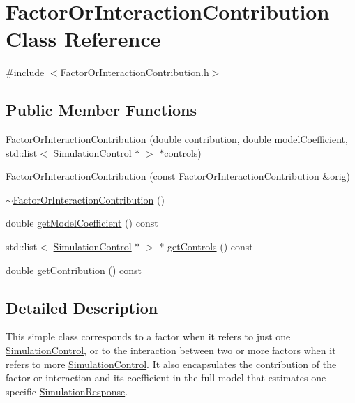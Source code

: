 \hypertarget{class_factor_or_interaction_contribution}{}\section{Factor\+Or\+Interaction\+Contribution Class Reference}
\label{class_factor_or_interaction_contribution}


{\ttfamily \#include $<$Factor\+Or\+Interaction\+Contribution.\+h$>$}

\subsection*{Public Member Functions}
\begin{DoxyCompactItemize}
\item 
\hyperlink{class_factor_or_interaction_contribution_aee33d23a9255292a4c9e7bb7c1b02e2d}{Factor\+Or\+Interaction\+Contribution} (double contribution, double model\+Coefficient, std\+::list$<$ \hyperlink{class_simulation_control}{Simulation\+Control} $\ast$ $>$ $\ast$controls)
\item 
\hyperlink{class_factor_or_interaction_contribution_a6c3335e47b137605f7258ceb6233be3a}{Factor\+Or\+Interaction\+Contribution} (const \hyperlink{class_factor_or_interaction_contribution}{Factor\+Or\+Interaction\+Contribution} \&orig)
\item 
\hyperlink{class_factor_or_interaction_contribution_ae9efdcdc1f162a045fc7b4bff3abf7b7}{$\sim$\+Factor\+Or\+Interaction\+Contribution} ()
\item 
double \hyperlink{class_factor_or_interaction_contribution_af1d9b3083c6176a1ac96f6abfa476c3c}{get\+Model\+Coefficient} () const 
\item 
std\+::list$<$ \hyperlink{class_simulation_control}{Simulation\+Control} $\ast$ $>$ $\ast$ \hyperlink{class_factor_or_interaction_contribution_a12556ece8eb1b2e9c31186571cabfea4}{get\+Controls} () const 
\item 
double \hyperlink{class_factor_or_interaction_contribution_ad0113b8462ffdf1040fe43f5f4f25e4a}{get\+Contribution} () const 
\end{DoxyCompactItemize}


\subsection{Detailed Description}
This simple class corresponds to a factor when it refers to just one \hyperlink{class_simulation_control}{Simulation\+Control}, or to the interaction between two or more factors when it refers to more \hyperlink{class_simulation_control}{Simulation\+Control}. It also encapsulates the contribution of the factor or interaction and its coefficient in the full model that estimates one specific \hyperlink{class_simulation_response}{Simulation\+Response}. 

